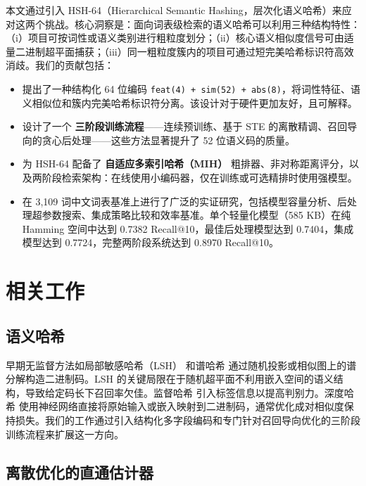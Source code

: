 \documentclass[11pt,a4paper]{article}
\begin{document}
本文通过引入 HSH-64（Hierarchical Semantic Hashing，层次化语义哈希）来应对这两个挑战。核心洞察是：面向词表级检索的语义哈希可以利用三种结构特性：（i）项目可按词性或语义类别进行粗粒度划分；（ii）核心语义相似度信号可由适量二进制超平面捕获；（iii）同一粗粒度簇内的项目可通过短完美哈希标识符高效消歧。我们的贡献包括：
\begin{itemize}[leftmargin=*]
    \item 提出了一种结构化 64 位编码 \texttt{feat(4) + sim(52) + abs(8)}，将词性特征、语义相似位和簇内完美哈希标识符分离。该设计对于硬件更加友好，且可解释。
    \item 设计了一个 \textbf{三阶段训练流程}——连续预训练、基于 STE 的离散精调、召回导向的贪心后处理——这些方法显著提升了 52 位语义码的质量。
    \item 为 HSH-64 配备了 \textbf{自适应多索引哈希（MIH）} 粗排器、非对称距离评分，以及两阶段检索架构：在线使用小编码器，仅在训练或可选精排时使用强模型。
    \item 在 3,109 词中文词表基准上进行了广泛的实证研究，包括模型容量分析、后处理超参数搜索、集成策略比较和效率基准。单个轻量化模型（585 KB）在纯 Hamming 空间中达到 0.7382 Recall@10，最佳后处理模型达到 0.7404，集成模型达到 0.7724，完整两阶段系统达到 0.8970 Recall@10。
\end{itemize}

\section{相关工作}

\subsection{语义哈希}

早期无监督方法如局部敏感哈希（LSH）\citep{datar2004locality} 和谱哈希 \citep{weiss2009spectral} 通过随机投影或相似图上的谱分解构造二进制码。LSH 的关键局限在于随机超平面不利用嵌入空间的语义结构，导致给定码长下召回率欠佳。监督哈希 \citep{liu2012supervised,shen2015supervised} 引入标签信息以提高判别力。深度哈希 \citep{xia2014supervised,cao2015deep} 使用神经网络直接将原始输入或嵌入映射到二进制码，通常优化成对相似度保持损失。我们的工作通过引入结构化多字段编码和专门针对召回导向优化的三阶段训练流程来扩展这一方向。

\subsection{离散优化的直通估计器}
\end{document}

